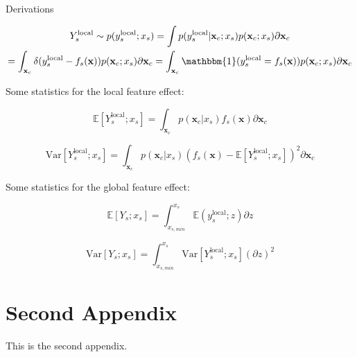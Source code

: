 \documentclass[wcp]{jmlr}
\newcommand{\xc}{\mathbf{x}_c}
\newcommand{\Ysloc}{Y_{s}^{\text{local}}}
\newcommand{\ysloc}{y_{s}^{\text{local}}}
\newcommand{\x}{\mathbf{x}}
\newcommand{\E}{\mathbb{E}}
\newcommand{\var}{\mathrm{Var}}
\newcommand{\1}{\mathbbm{1}}
\begin{document}
Derivations

\begin{multline}
    \Ysloc \sim p(\ysloc ; x_s)
    = \int{} p(\ysloc|\xc;x_s) p(\xc;x_s) \partial \xc \\
    = \int_{\xc} \delta(\ysloc-f_s(\x)) p(\xc;x_s) \partial \xc
    = \int_{\xc} \1(\ysloc=f_s(\x)) p(\xc;x_s) \partial \xc
\end{multline}

Some statistics for the local feature effect:

\begin{equation}
  \E[ \Ysloc ; x_s] = \int_{\xc} p(\xc|x_s) f_s(\x) \partial \xc
\end{equation}

\begin{equation}
  \var[ \Ysloc ; x_s] = \int_{\xc} p(\xc|x_s) (f_s(\x) - \E[ \Ysloc ; x_s])^2 \partial \xc
\end{equation}

Some statistics for the global feature effect:

\begin{equation}
  \E[Y_s ; x_s] = \int_{x_{s,min}}^{x_s} \E(\ysloc;z) \partial z
\end{equation}

\begin{equation}
  \var[Y_s ; x_s] = \int_{x_{s,min}}^{x_s} \var[ \Ysloc ; x_s] (\partial z)^2
\end{equation}


\section{Second Appendix}\label{apd:second}

This is the second appendix.
\end{document}
